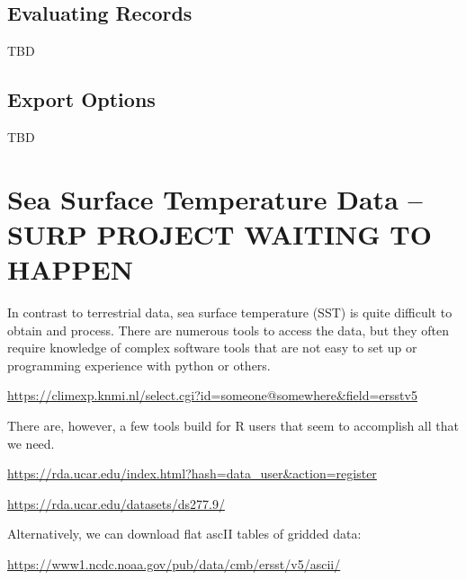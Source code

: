 \documentclass{article}\usepackage[]{graphicx}\usepackage[]{color}
\begin{document}
\subsection{Evaluating Records}

TBD

\subsection{Export Options}

TBD

\section{Sea Surface Temperature Data -- SURP PROJECT WAITING TO HAPPEN}

In contrast to terrestrial data, sea surface temperature (SST) is quite difficult to obtain and process. There are numerous tools to access the data, but they often require knowledge of complex software tools that are not easy to set up or programming experience with python or others.

\url{https://climexp.knmi.nl/select.cgi?id=someone@somewhere&field=ersstv5}

There are, however, a few tools build for R users that seem to accomplish all that we need. 

\url{https://rda.ucar.edu/index.html?hash=data_user&action=register}

\url{https://rda.ucar.edu/datasets/ds277.9/}

Alternatively, we can download flat ascII tables of gridded data:

\url{https://www1.ncdc.noaa.gov/pub/data/cmb/ersst/v5/ascii/}
\end{document}
